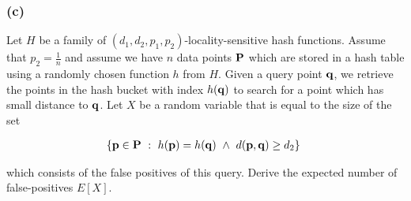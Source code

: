 \documentclass[11pt]{article}
\begin{document}
\subsubsection{(c)}\label{c}

Let \(H\) be a family of \((d_1,d_2,p_1,p_2)\)-locality-sensitive hash
functions. Assume that \(p_2=\frac{1}{n}\) and assume we have \(n\) data
points \(\bf P\) which are stored in a hash table using a randomly
chosen function \(h\) from \(H\). Given a query point \(\bf q\), we
retrieve the points in the hash bucket with index \(h(\bf q)\) to search
for a point which has small distance to \(\bf q\). Let \(X\) be a random
variable that is equal to the size of the set

\[
\begin{aligned}
\left\{{\bf p \in P}~:~ h({\bf p})=h({\bf q}) ~\wedge~ d({\bf p,q}) \geq d_2\right\}\
\end{aligned}
\]

which consists of the false positives of this query. Derive the expected
number of false-positives \(E\left[ X \right]\).


    
    
    
    
\end{document}
